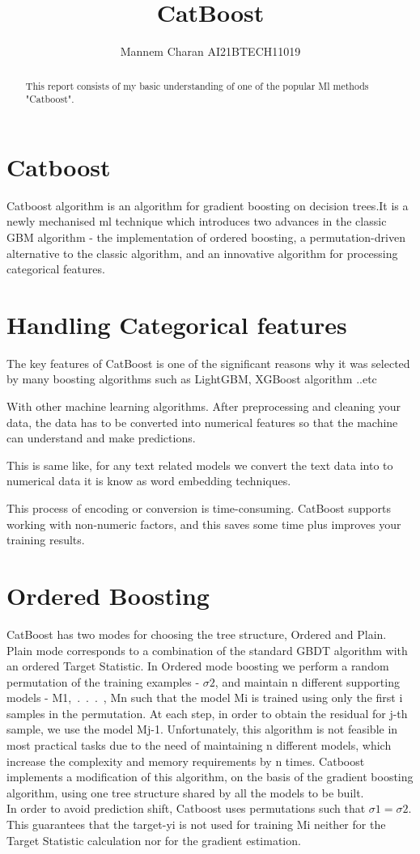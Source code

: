 \documentclass[journal,12pt,onecolumn]{IEEEtran}
\theoremstyle{remark}
\numberwithin{equation}{section}
\begin{document}
		\title{CatBoost}
		\author{ Mannem Charan AI21BTECH11019}
		 \maketitle
		\begin{abstract}
			This report consists of my basic understanding of one of the popular Ml methods "Catboost".
		\end{abstract}
		\section{Catboost}
		 Catboost algorithm is an algorithm for gradient boosting on decision trees.It is a newly mechanised ml technique which introduces two advances in the classic GBM algorithm - the implementation of ordered boosting, a permutation-driven alternative to the classic algorithm, and an innovative algorithm for processing categorical features.
		 \section{Handling Categorical features}
		 The key features of CatBoost is one of the significant reasons why it was selected by many boosting algorithms such as LightGBM,  XGBoost algorithm ..etc

With other machine learning algorithms. After preprocessing and cleaning your data, the data has to be converted into numerical features so that the machine can understand and make predictions.

This is same like, for any text related models we convert the text data into to numerical data it is know as word embedding techniques.

This process of encoding or conversion is time-consuming. CatBoost supports working with non-numeric factors, and this saves some time plus improves your training results.
                \section{Ordered Boosting}
CatBoost has two modes for choosing the tree structure, Ordered and Plain. Plain mode corresponds to a combination of the standard GBDT algorithm with an ordered Target Statistic. In Ordered mode boosting we perform a random permutation of the training examples - $\sigma2$, and maintain n different supporting models - M1,\, .\, .\, .\, , Mn such that the model Mi is trained using only the first i samples in the permutation. At each step, in order to obtain the residual for j-th sample, we use the model Mj-1. Unfortunately, this algorithm is not feasible in most practical tasks due to the need of maintaining n different models, which increase the complexity and memory requirements by n times. Catboost implements a modification of this algorithm, on the basis of the gradient boosting algorithm, using one tree structure shared by all the models to be built.\\
In order to avoid prediction shift, Catboost uses permutations such that $\sigma1 = \sigma2$. This guarantees that the target-yi is not used for training Mi neither for the Target Statistic calculation nor for the gradient estimation.
\end{document}
